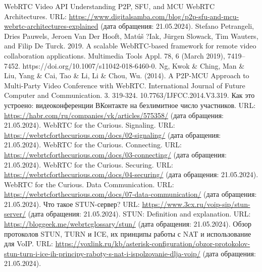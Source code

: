 \documentclass[a4paper,article,14pt]{extarticle}
\begin{document}
\begin{thebibliography}{1}
WebRTC Video API
Understanding P2P, SFU, and MCU WebRTC Architectures. URL: \url{https://www.digitalsamba.com/blog/p2p-sfu-and-mcu-webrtc-architectures-explained} (дата обращения: 21.05.2024).
 Stefano Petrangeli, Dries Pauwels, Jeroen Van Der Hooft, Matúš ?Iak, Jürgen Slowack, Tim Wauters, and Filip De Turck. 2019. A scalable WebRTC-based framework for remote video collaboration applications. Multimedia Tools Appl. 78, 6 (March 2019), 7419–7452. https://doi.org/10.1007/s11042-018-6460-0.
 Ng, Kwok \& Ching, Man \& Liu, Yang \& Cai, Tao \& Li, Li \& Chou, Wu. (2014). A P2P-MCU Approach to Multi-Party Video Conference with WebRTC. International Journal of Future Computer and Communication. 3. 319-324. 10.7763/IJFCC.2014.V3.319.
 Как это устроено: видеоконференции ВКонтакте на безлимитное число участников. URL: \url{https://habr.com/ru/companies/vk/articles/575358/} (дата обращения: 21.05.2024).
 WebRTC for the Curious. Signaling. URL: \url{https://webrtcforthecurious.com/docs/02-signaling/} (дата обращения: 21.05.2024).
 WebRTC for the Curious. Connecting. URL: \url{https://webrtcforthecurious.com/docs/03-connecting/} (дата обращения: 21.05.2024).
 WebRTC for the Curious. Securing. URL: \url{https://webrtcforthecurious.com/docs/04-securing/} (дата обращения: 21.05.2024).
 WebRTC for the Curious. Data Communication. URL: \url{https://webrtcforthecurious.com/docs/07-data-communication/} (дата обращения: 21.05.2024).
 Что такое STUN-сервер? URL: \url{https://www.3cx.ru/voip-sip/stun-server/} (дата обращения: 21.05.2024).
 STUN: Definition and explanation. URL: \url{https://bloggeek.me/webrtcglossary/stun/} (дата обращения: 21.05.2024).
 Обзор протоколов STUN, TURN и ICE, их принципы работы с NAT и использование для VoIP. URL: \url{https://voxlink.ru/kb/asterisk-configuration/obzor-protokolov-stun-turn-i-ice-ih-principy-raboty-s-nat-i-ispolzovanie-dlja-voip/} (дата обращения: 21.05.2024).
\end{thebibliography}
\end{document}
